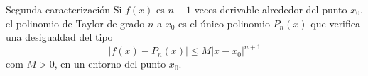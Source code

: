 \begin{frame}{Segunda caracterización}
  Si $f(x)$ es $n+1$ veces derivable alrededor del punto $x_0$, el polinomio de Taylor de grado $n$ a $x_0$ es el único polinomio $P_n(x)$ que verifica una desigualdad del tipo
  \\
  $$|f(x)-P_n(x)| \leq M|x-x_0|^{n+1}$$
  com $M > 0$, en un entorno del punto $x_0$.
\end{frame}
